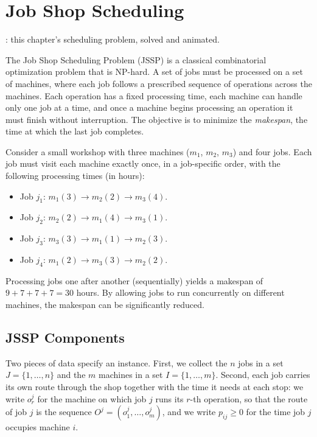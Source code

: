 \newpage





\section{Job Shop Scheduling}
\label{sec:job-shop}

\begin{tryit}
: this chapter's scheduling problem, solved and animated.
\end{tryit}


The Job Shop Scheduling Problem (JSSP) is a classical combinatorial optimization problem that is NP-hard.
A set of jobs must be processed on a set of machines, where each job follows a prescribed sequence of operations across the machines.
Each operation has a fixed processing time, each machine can handle only one job at a time, and once a machine begins processing an operation it must finish without interruption.
The objective is to minimize the \emph{makespan}, the time at which the last job completes.

Consider a small workshop with three machines ($m_1$, $m_2$, $m_3$) and four jobs.
Each job must visit each machine exactly once, in a job-specific order, with the following processing times (in hours):

\begin{itemize}
  \item Job $j_1$: $m_1(3) \to m_2(2) \to m_3(4)$.
  \item Job $j_2$: $m_2(2) \to m_1(4) \to m_3(1)$.
  \item Job $j_3$: $m_3(3) \to m_1(1) \to m_2(3)$.
  \item Job $j_4$: $m_1(2) \to m_3(3) \to m_2(2)$.
\end{itemize}

Processing jobs one after another (sequentially) yields a makespan of $9+7+7+7 = 30$ hours.
By allowing jobs to run concurrently on different machines, the makespan can be significantly reduced.

\subsection{JSSP Components}
Two pieces of data specify an instance.
First, we collect the $n$ jobs in a set $J = \{1, \ldots, n\}$ and the $m$ machines in a set $I = \{1, \ldots, m\}$.
Second, each job carries its own route through the shop together with the time it needs at each stop: we write $o_r^j$ for the machine on which job $j$ runs its $r$-th operation, so that the route of job $j$ is the sequence $O^j = (o_1^j, \ldots, o_m^j)$, and we write $p_{ij} \geq 0$ for the time job $j$ occupies machine $i$.

